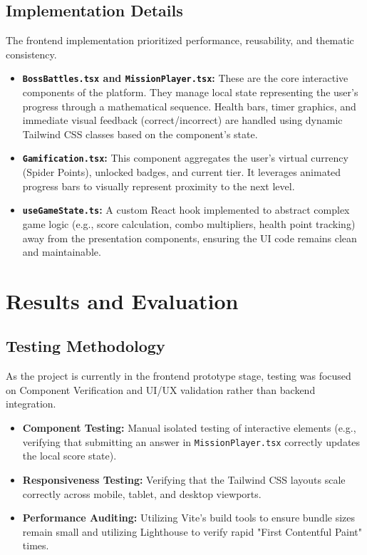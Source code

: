 \documentclass[12pt,a4paper]{report}
\begin{document}
\section{Implementation Details}
The frontend implementation prioritized performance, reusability, and thematic consistency.
\begin{itemize}
    \item \textbf{\texttt{BossBattles.tsx} and \texttt{MissionPlayer.tsx}:} These are the core interactive components of the platform. They manage local state representing the user's progress through a mathematical sequence. Health bars, timer graphics, and immediate visual feedback (correct/incorrect) are handled using dynamic Tailwind CSS classes based on the component's state.
    \item \textbf{\texttt{Gamification.tsx}:} This component aggregates the user's virtual currency (Spider Points), unlocked badges, and current tier. It leverages animated progress bars to visually represent proximity to the next level.
    \item \textbf{\texttt{useGameState.ts}:} A custom React hook implemented to abstract complex game logic (e.g., score calculation, combo multipliers, health point tracking) away from the presentation components, ensuring the UI code remains clean and maintainable.
\end{itemize}

\chapter{Results and Evaluation}

\section{Testing Methodology}
As the project is currently in the frontend prototype stage, testing was focused on Component Verification and UI/UX validation rather than backend integration.
\begin{itemize}
    \item \textbf{Component Testing:} Manual isolated testing of interactive elements (e.g., verifying that submitting an answer in \texttt{MissionPlayer.tsx} correctly updates the local score state).
    \item \textbf{Responsiveness Testing:} Verifying that the Tailwind CSS layouts scale correctly across mobile, tablet, and desktop viewports.
    \item \textbf{Performance Auditing:} Utilizing Vite's build tools to ensure bundle sizes remain small and utilizing Lighthouse to verify rapid "First Contentful Paint" times.
\end{itemize}
\end{document}
